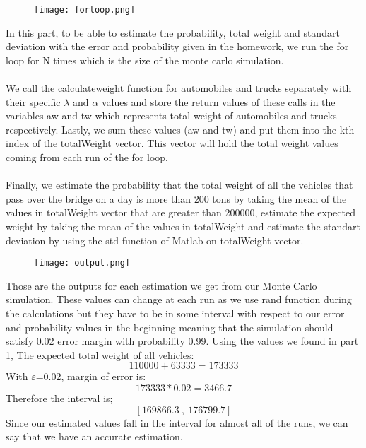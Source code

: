 \documentclass[12pt]{article}
\begin{document}
\begin{figure}[H]
\centerline{\texttt{[image: forloop.png]}}
\label{fig}
\end{figure}
In this part, to be able to estimate the probability, total weight and standart deviation with the error and probability given in the homework, we run the for loop for N times which is the size of the monte carlo simulation.\\\\
We call the calculateweight function for automobiles and trucks separately with their specific $\lambda$ and $\alpha$ values and store the return values of these calls in the variables aw and tw which represents total weight of automobiles and trucks respectively. 
Lastly, we sum these values (aw and tw) and put them into the kth index of the totalWeight vector. This vector will hold the total weight values coming from each run of the for loop. \\\\
Finally, we estimate the probability that the total weight of all the vehicles that pass over the bridge on a day is more than 200 tons by taking the mean of the values in totalWeight vector that are greater than 200000, estimate the expected weight by taking the mean of the values in totalWeight and estimate the standart deviation by using the std function of Matlab on totalWeight vector. 
\begin{figure}[H]
\centerline{\texttt{[image: output.png]}}
\label{fig}
\end{figure}
Those are the outputs for each estimation we get from our Monte Carlo simulation. These values can change at each run as we use rand function during the calculations but they have to be in some interval with respect to our error and probability values in the beginning meaning that the simulation should satisfy 0.02 error margin with probability 0.99. 
Using the values we found in part 1, 
The expected total weight of all vehicles:
\[110000+63333=173333\]
With $\varepsilon$=0.02, margin of error is:
\[173333*0.02=3466.7\]
Therefore the interval is;
\[[169866.3 \ , \ 176799.7]\]
Since our estimated values fall in the interval for almost all of the runs, we can say that we have an accurate estimation.
\end{document}
